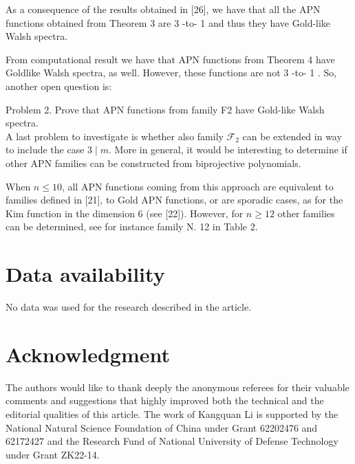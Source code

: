 \documentclass[10pt]{article}
\begin{document}
As a consequence of the results obtained in [26], we have that all the APN functions obtained from Theorem 3 are 3 -to- 1 and thus they have Gold-like Walsh spectra.

From computational result we have that APN functions from Theorem 4 have Goldlike Walsh spectra, as well. However, these functions are not 3 -to- 1 . So, another open question is:

Problem 2. Prove that APN functions from family F2 have Gold-like Walsh spectra.\\
A last problem to investigate is whether also family $\mathcal{F}_{2}$ can be extended in way to include the case $3 \mid m$. More in general, it would be interesting to determine if other APN families can be constructed from biprojective polynomials.

When $n \leq 10$, all APN functions coming from this approach are equivalent to families defined in [21], to Gold APN functions, or are sporadic cases, as for the Kim function in the dimension 6 (see [22]). However, for $n \geq 12$ other families can be determined, see for instance family N. 12 in Table 2.

\section*{Data availability}
No data was used for the research described in the article.

\section*{Acknowledgment}
The authors would like to thank deeply the anonymous referees for their valuable comments and suggestions that highly improved both the technical and the editorial qualities of this article. The work of Kangquan Li is supported by the National Natural Science Foundation of China under Grant 62202476 and 62172427 and the Research Fund of National University of Defense Technology under Grant ZK22-14.
\end{document}
